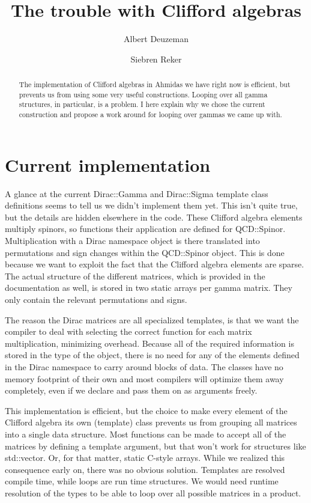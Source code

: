 \documentclass[a4paper,10pt]{article}
\title{The trouble with Clifford algebras}
\author{Albert Deuzeman \and Siebren Reker}
\begin{document}
\maketitle

\begin{abstract}
The implementation of Clifford algebras in Ahmidas we have right now is efficient,
but prevents us from using some very useful constructions. Looping over all gamma
structures, in particular, is a problem. I here explain why we chose the current 
construction and propose a work around for looping over gammas we came up with. 
\end{abstract}

\section{Current implementation}

A glance at the current Dirac::Gamma and Dirac::Sigma template class definitions seems to
tell us we didn't implement them yet. This isn't quite true, but the details are hidden
elsewhere in the code. These Clifford algebra elements multiply spinors, so functions their
application are defined for QCD::Spinor. Multiplication with a Dirac namespace object is there 
translated into permutations and sign changes within the QCD::Spinor object. This is done 
because we want to exploit the fact that the Clifford algebra elements are sparse. The actual
structure of the different matrices, which is provided in the documentation as well, is stored
in two static arrays per gamma matrix. They only contain the relevant permutations and signs.

The reason the Dirac matrices are all specialized templates, is that we want the compiler to deal 
with selecting the correct function for each matrix multiplication, minimizing overhead. Because
all of the required information is stored in the type of the object, there is no need for any
of the elements defined in the Dirac namespace to carry around blocks of data. The classes have
no memory footprint of their own and most compilers will optimize them away completely, even if
we declare and pass them on as arguments freely.

This implementation is efficient, but the choice to make every element of the Clifford algebra its 
own (template) class prevents us from grouping all matrices into a single data structure. Most 
functions can be made to accept all of the matrices by defining a template argument, but that won't 
work for structures like std::vector. Or, for that matter, static C-style arrays. While we realized
this consequence early on, there was no obvious solution. Templates are resolved compile time,
while loops are run time structures. We would need runtime resolution of the types to be able
to loop over all possible matrices in a product.
\end{document}
